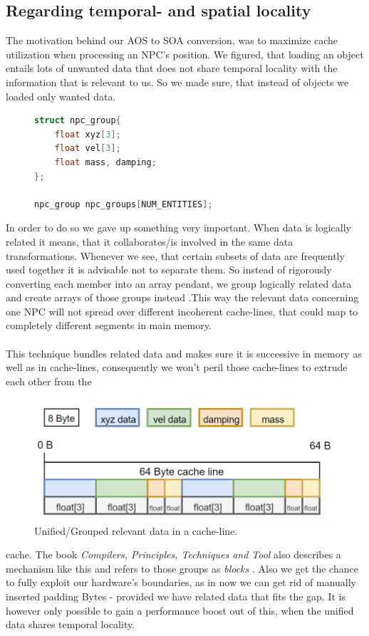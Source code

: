 \subsection{Regarding temporal- and spatial locality}\label{rtasl}
The motivation behind our AOS to SOA conversion, was to maximize cache utilization when processing an NPC's position. We figured, that loading an object entails lots of unwanted data that does not share temporal locality with the information that is relevant to us. So we made sure, that instead of objects we loaded only wanted data.
\begin{figure}
\begin{lstlisting}[language=C++,numbers=none,name={Consolidating related data},label={component_npc}]
struct npc_group{
	float xyz[3];
	float vel[3];
	float mass, damping;
};

npc_group npc_groups[NUM_ENTITIES];
\end{lstlisting}
\end{figure}
In order to do so we gave up something very important. When data is logically related it means, that it collaborates/is involved in the same data transformations. Whenever we see, that certain subsets of data are frequently used together it is advisable not to separate them. So instead of rigorously converting each member into an array pendant, we group logically related data and create arrays of those groups instead .This way the relevant data concerning one NPC will not spread over different incoherent cache-lines, that could map to completely different segments in main memory.\\\\
This technique bundles related data and makes sure it is successive in memory as well as in cache-lines, consequently we won't peril those cache-lines to extrude each other from the 
\subsubsection{}
\vspace{-1cm}
\begin{figure}
	\vspace{-0.4cm}
	\centering
	\includegraphics[width=.37\textwidth, height=0.17\textwidth]{PICs/CacheUtilizationNPCComp}
	\caption{Unified/Grouped relevant data in a cache-line.}\label{cache_utilization_comp}
\end{figure}
cache. The book \textit{Compilers, Principles, Techniques and Tool} also describes a mechanism like this and refers to those groups as \textit{blocks} .
Also we get the chance to fully exploit our hardware's boundaries, as in now we can get rid of manually inserted padding Bytes  - provided we have related data that fits the gap. It is however only possible to gain a performance boost out of this, when the unified data shares temporal locality.


